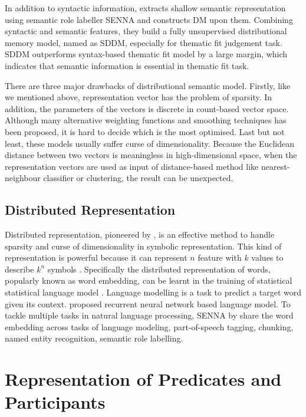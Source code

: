 \documentclass[a4paper]{article}
\begin{document}
In addition to syntactic information, \citet{sayeed2014combining} extracts shallow semantic representation using semantic role labeller SENNA and constructs DM upon them. Combining syntactic and semantic features, they build a fully unsupervised distributional memory model, named as SDDM, especially for thematic fit judgement task. SDDM outperforms syntax-based thematic fit model by a large margin, which indicates that semantic information is essential in thematic fit task. 

There are three major drawbacks of distributional semantic model. Firstly, like we mentioned above, representation vector has the problem of sparsity. In addition, the parameters of the vectors is discrete in count-based vector space. Although many alternative weighting functions and smoothing techniques has been proposed, it is hard to decide which is the most optimised. Last but not least, these models usually suffer curse of dimensionality. Because the Euclidean distance between two vectors is meaningless in high-dimensional space, when the representation vectors are used as input of distance-based method like nearest-neighbour classifier or clustering, the result can be unexpected. 

\subsection{Distributed Representation} \label{sec:repr}
Distributed representation, pioneered by \citet{hinton1986learning}, is an effective method to handle sparsity and curse of dimensionality in symbolic representation. This kind of representation is powerful because it can represent $n$ feature with $k$ values to describe $k^n$ symbols \citep{Goodfellow-et-al-2016}. Specifically the distributed representation of words, popularly known as word embedding, can be learnt in the training of statistical statistical language model \citep{bengio2003neural}. Language modelling is a task to predict a target word given its context. \citet{mikolov2013distributed} proposed recurrent neural network based language model. To tackle multiple tasks in natural language processing, SENNA by \citet{collobert2011natural} share the word embedding across tasks of language modeling, part-of-speech tagging, chunking, named entity recognition, semantic role labelling. 


\section{Representation of Predicates and Participants}
\end{document}
